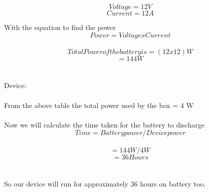 	$$Voltage = 12 V$$
	$$Current = 12 A$$
	
With the equation to find the power
	$$Power = Voltage x Current$$ \\
		
		$$Total Power of the battery is = (12 x 12) W$$
		$$= 144 W$$
\\
\\
Device:
\\
\\
	
From the above table the total power used by the box  = 4 W
\\
\\
Now we will calculate the time taken for the battery to discharge
$$Time = Battery power / Device power$$\\
	$$= 144 W / 4 W$$
	$$= 36 Hours $$
\\
\\
So our device will run for approximately 36 hours on battery too.

\vspace{0.4in}
